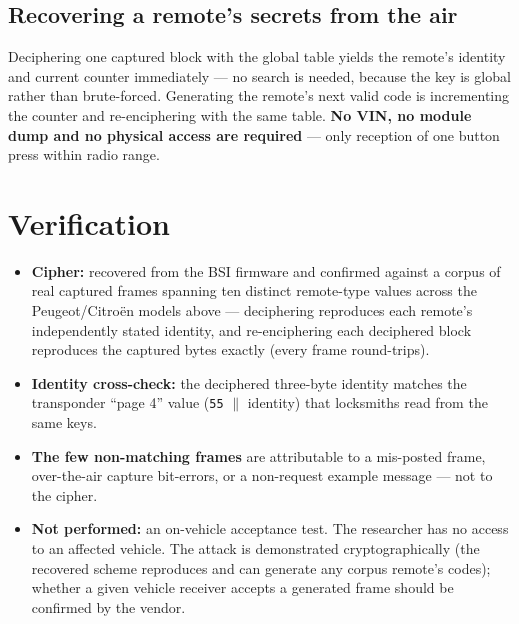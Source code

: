\documentclass[11pt,a4paper]{article}
\newcommand{\hex}[1]{\texttt{#1}}
\begin{document}
\subsection{Recovering a remote's secrets from the air}
Deciphering one captured block with the global table yields the remote's identity and current counter immediately --- no search is needed, because the key is global rather than brute-forced. Generating the remote's next valid code is incrementing the counter and re-enciphering with the same table. \textbf{No VIN, no module dump and no physical access are required} --- only reception of one button press within radio range.

\section{Verification}
\begin{itemize}
\item \textbf{Cipher:} recovered from the BSI firmware and confirmed against a corpus of real captured frames spanning ten distinct remote-type values across the Peugeot/Citro\"en models above --- deciphering reproduces each remote's independently stated identity, and re-enciphering each deciphered block reproduces the captured bytes exactly (every frame round-trips).
\item \textbf{Identity cross-check:} the deciphered three-byte identity matches the transponder ``page 4'' value (\hex{55} $\|$ identity) that locksmiths read from the same keys.
\item \textbf{The few non-matching frames} are attributable to a mis-posted frame, over-the-air capture bit-errors, or a non-request example message --- not to the cipher.
\item \textbf{Not performed:} an on-vehicle acceptance test. The researcher has no access to an affected vehicle. The attack is demonstrated cryptographically (the recovered scheme reproduces and can generate any corpus remote's codes); whether a given vehicle receiver accepts a generated frame should be confirmed by the vendor.
\end{itemize}
\end{document}

